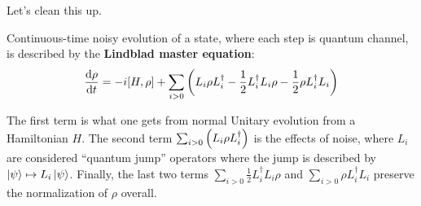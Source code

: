 Let's clean this up.
\begin{theorem}
    Continuous-time noisy evolution of a state, where each step is quantum channel,
    is described by the \textbf{Lindblad master equation}:
    \[ \dv{\rho}{t} = -i [H, \rho] + \sum_{i > 0} \qty(L_i \rho L_i^{\dagger} - \frac{1}{2} L_i^{\dagger} L_i \rho - \frac{1}{2} \rho L_i^{\dagger} L_i) \]
\end{theorem}
The first term is what one gets from normal Unitary evolution from a Hamiltonian $H$. The second term
$ \sum_{i > 0} \qty(L_i \rho L_i^{\dagger})$ is the effects of noise,
where $L_i$ are considered ``quantum jump'' operators where the jump is described by $\ket{\psi} \mapsto L_i \ket{\psi}$.
Finally, the last two terms $\sum_{i > 0} \frac{1}{2}L_i^{\dagger} L_i \rho$ and $\sum_{i > 0} \rho L_i^{\dagger} L_i$ preserve the normalization of $\rho$ overall. 

